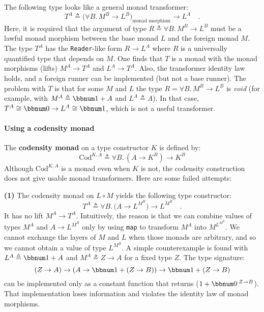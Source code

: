 The following type looks like a general monad transformer:
\[
T^{A}\triangleq\big(\forall B.\,M^{B}\rightarrow L^{B}\big)_{\text{monad morphism}}\rightarrow L^{A}\quad.
\]
Here, it is required that the argument of type $R\triangleq\forall B.\,M^{B}\rightarrow L^{B}$
must be a lawful monad morphism between the base monad $L$ and the
foreign monad $M$. The type $T^{A}$ has the \lstinline!Reader!-like
form $R\rightarrow L^{A}$ where $R$ is a universally quantified
type that depends on $M$. One finds that $T$ is a monad with the
monad morphisms (lifts) $M^{A}\rightarrow T^{A}$ and $L^{A}\rightarrow T^{A}$.
Also, the transformer identity law holds, and a foreign runner can
be implemented (but not a base runner). The problem with $T$ is that
for some $M$ and $L$ the type $R=\forall B.\,M^{B}\rightarrow L^{B}$
is \emph{void} (for example, with $M^{A}\triangleq\bbnum 1+A$ and
$L^{A}\triangleq A$). In that case, $T^{A}\cong\bbnum 0\rightarrow L^{A}\cong\bbnum 1$,
which is not a useful transformer.

\paragraph{Using a codensity monad}

The \textbf{codensity monad} on a type
constructor $K$ is defined by:
\[
\text{Cod}^{K,A}\triangleq\forall B.\,(A\rightarrow K^{B})\rightarrow K^{B}
\]
Although $\text{Cod}^{K,A}$ is a monad even when $K$ is not, the
codensity construction does not give usable monad transformers. Here
are some failed attempts:

\textbf{(1)} The codensity monad on $L\circ M$ yields the following
type constructor:
\[
T^{A}\triangleq\forall B.\,\big(A\rightarrow L^{M^{B}}\big)\rightarrow L^{M^{B}}\quad.
\]
It has no lift $M^{A}\rightarrow T^{A}$. Intuitively, the reason
is that we can combine values of types $M^{A}$ and $A\rightarrow L^{M^{B}}$
only by using \lstinline!map! to transform $M^{A}$ into $M^{L^{M^{B}}}$.
We cannot exchange the layers of $M$ and $L$ when those monads are
arbitrary, and so we cannot obtain a value of type $L^{M^{B}}$. A
simple counterexample is found with $L^{A}\triangleq\bbnum 1+A$ and
$M^{A}\triangleq Z\rightarrow A$ for a fixed type $Z$. The type
signature:
\[
(Z\rightarrow A)\rightarrow(A\rightarrow\bbnum 1+(Z\rightarrow B))\rightarrow\bbnum 1+(Z\rightarrow B)
\]
can be implemented only as a constant function that returns ($1+\bbnum 0^{:Z\rightarrow B}$).
That implementation loses information and violates the identity law
of monad morphisms.

